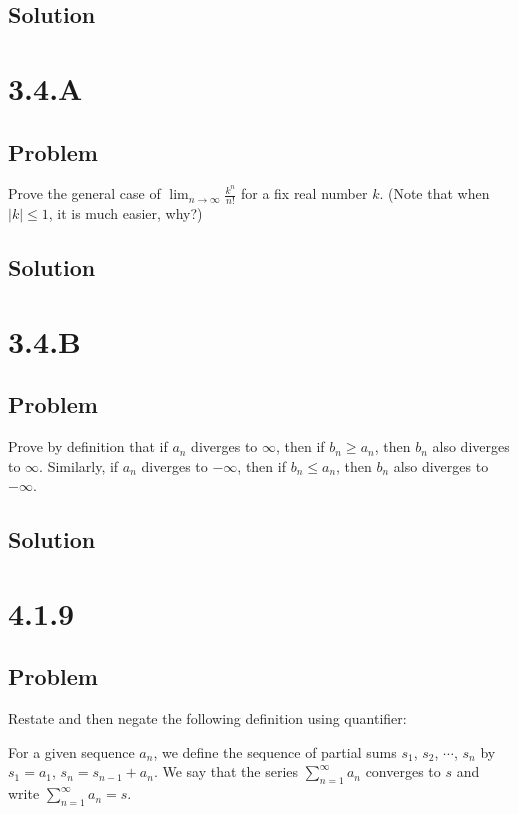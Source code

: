 \documentclass[12pt]{article}
\newcommand{\abs}  [1]{\left|       #1 \right|      }
\begin{document}
\subsection*{Solution}



\section*{3.4.A}

\subsection*{Problem}
Prove the general case of $\lim_{n \to \infty} \frac{k^n}{n!}$ for a fix real number $k$. (Note that when $\abs{k} \leq 1$, it is much easier, why?)

\subsection*{Solution}



\section*{3.4.B}

\subsection*{Problem}
Prove by definition that if $a_n$ diverges to $\infty$, then if $b_n \geq a_n$, then $b_n$ also diverges to $\infty$. Similarly, if $a_n$ diverges to $-\infty$, then if $b_n \leq a_n$, then $b_n$ also diverges to $-\infty$.

\subsection*{Solution}



\section*{4.1.9}

\subsection*{Problem}
Restate and then negate the following definition using quantifier:

For a given sequence $a_n$, we define the sequence of partial sums $s_1$, $s_2$, $\cdots$, $s_n$ by $s_1 = a_1$, $s_n = s_{n - 1} + a_n$. We say that the series $\sum_{n = 1}^\infty a_n$ converges to $s$ and write $\sum_{n = 1}^\infty a_n = s$.
\end{document}
